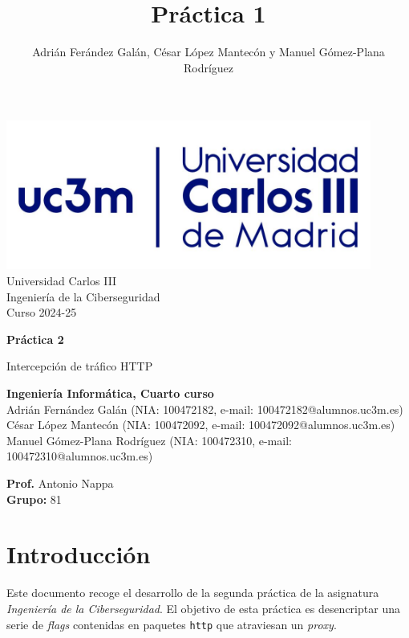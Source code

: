 \documentclass[]{article}
\title{Práctica 1}
\author{Adrián Ferández Galán, César López Mantecón y Manuel Gómez-Plana Rodríguez}
\begin{document}
\begin{titlepage}
    \centering
   \includegraphics[width=0.9\textwidth]{uc3m.jpg} 
    {\Huge Universidad Carlos III\\
    
     \Large Ingeniería de la Ciberseguridad\\
     \vspace{0.5cm}
     Curso 2024-25}
    \vspace{2cm}

    {\Huge \textbf{Práctica 2} \par}
    \vspace{0.5cm}
    {\Large Intercepción de tráfico HTTP\par}
    \vspace{8cm}

   \textbf{Ingeniería Informática, Cuarto curso}\\
    \vspace{0.2cm} 
    Adrián Fernández Galán       (NIA: 100472182, e-mail: 100472182@alumnos.uc3m.es)\\
    César López Mantecón         (NIA: 100472092, e-mail: 100472092@alumnos.uc3m.es)\\
    Manuel Gómez-Plana Rodríguez (NIA: 100472310, e-mail: 100472310@alumnos.uc3m.es)
    \vspace{0.5cm}

   
    \textbf{Prof.} Antonio Nappa\\
    
    \textbf{Grupo: } 81   
    
\end{titlepage}
\newpage


\newpage

\lstset{style=bash}
\section{Introducción}
\label{sec:introduccion}
Este documento recoge el desarrollo de la segunda práctica de la asignatura
\textit{Ingeniería de la Ciberseguridad}. El objetivo de esta práctica es
desencriptar una serie de \textit{flags} contenidas en paquetes \texttt{http}
que atraviesan un \textit{proxy}.
\end{document}
